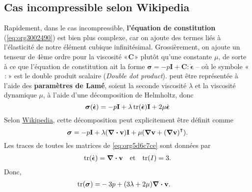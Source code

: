 \documentclass[10pt]{article}
\numberwithin{equation}{section}
\newcommand{\vv}{\vb{v}}
\newcommand{\pt}{\hspace{1pt}} %
\begin{document}
\subsection{Cas incompressible selon Wikipedia}
\label{sec:org86a5b52}
Rapidement, dans le cas incompressible, \textbf{l'équation de constitution} (\ref{eq:org3002490}) est bien plus complexe, car on ajoute des termes liés à l'élasticité de notre élément cubique infinitésimal.
Grossièrement, on ajoute un tenseur de 4ème ordre pour la viscosité  «\(\pt\mathbf{C}\pt\)» plutôt qu'une constante \(\mu\), de sorte à ce que l'équation de constitution ait la forme \(\boldsymbol{\sigma}= - p\mathbf{I} + \mathbf{C}:\dot{\boldsymbol{\epsilon}}\) -- où le symbole «\(\pt:\pt\)» est le double produit scalaire (\emph{Double dot product}).
 peut être représentée à l'aide des \textbf{paramètres de Lamé}, soient la seconde viscosité \(\lambda\) et la viscosité dynamique \(\mu\), à l'aide d'une décomposition de Helmholtz, donc
\begin{equation}
   \boldsymbol{\sigma}(\dot{ \boldsymbol{\epsilon}} ) = -p\mathbf{I} + \lambda\trace(\dot{\boldsymbol{\epsilon}}) \mathbf{I} + 2\mu\dot{\boldsymbol{\epsilon}}
\end{equation}
Selon \href{https://en.wikipedia.org/wiki/Newtonian\_fluid\#Newtonian\_law\_of\_viscosity}{Wikipedia}, cette décomposition peut explicitement être définit comme
\begin{equation}
\label{eq:org5d6c7ce}
   \boldsymbol{\sigma} = -p\mathbf{I} + \lambda\qty(\divergence{\vv}) \mathbf{I} + \mu\qty(\gradient{\vv} + \qty(\gradient{\vv})^\intercal).
\end{equation}
Les traces de toutes les matrices de \ref{eq:org5d6c7ce} sont données par
\begin{align}
   &&\trace(\dot{\boldsymbol{\epsilon}}) = \divergence{\vv}
   && \text{et}
   &&\trace(I) = 3.&& 
\end{align}
Donc,
\begin{align}
   \trace(\boldsymbol{\sigma}) = &
    -3p + \qty(3\lambda + 2\mu)\divergence{\vv}.
\end{align}
\end{document}
